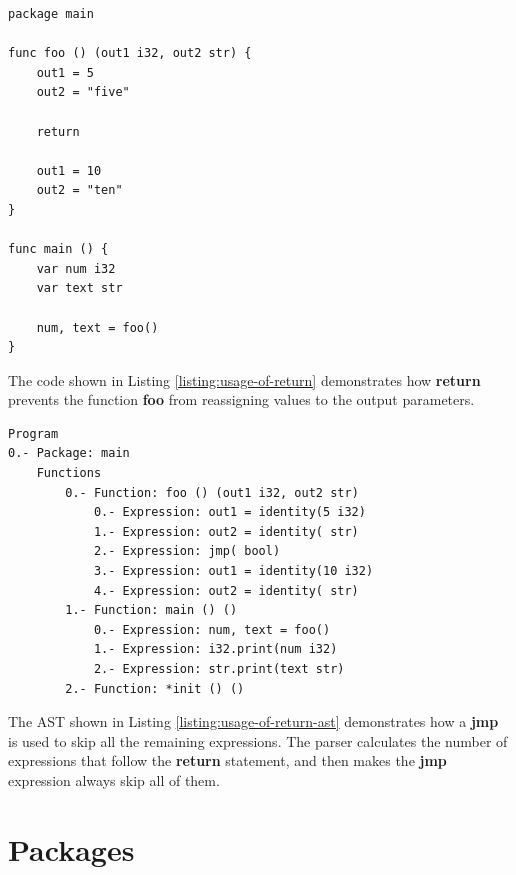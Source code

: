 \documentclass[11pt,fleqn,openany]{book} %
\begin{document}
\begin{lstlisting}[caption={Usage of return},captionpos=b,label={listing:usage-of-return}]
package main

func foo () (out1 i32, out2 str) {
	out1 = 5
    out2 = "five"
    
    return
    
    out1 = 10
    out2 = "ten"
}

func main () {
	var num i32
    var text str
    
    num, text = foo()
}
\end{lstlisting}

The code shown in Listing \ref{listing:usage-of-return} demonstrates how \textbf{return} prevents the function \textbf{foo} from reassigning values to the output parameters.

\begin{lstlisting}[caption={Usage of return},captionpos=b,label={listing:usage-of-return-ast}]
Program
0.- Package: main
	Functions
		0.- Function: foo () (out1 i32, out2 str)
			0.- Expression: out1 = identity(5 i32)
			1.- Expression: out2 = identity( str)
			2.- Expression: jmp( bool)
			3.- Expression: out1 = identity(10 i32)
			4.- Expression: out2 = identity( str)
		1.- Function: main () ()
			0.- Expression: num, text = foo()
			1.- Expression: i32.print(num i32)
			2.- Expression: str.print(text str)
		2.- Function: *init () ()
\end{lstlisting}

The AST shown in Listing \ref{listing:usage-of-return-ast} demonstrates how a \textbf{jmp} is used to skip all the remaining expressions. The parser calculates the number of expressions that follow the \textbf{return} statement, and then makes the \textbf{jmp} expression always skip all of them.


\chapter{Packages}
\label{chapter:packages}
\end{document}
